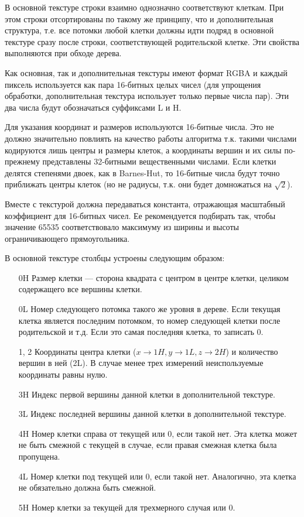 В основной текстуре строки взаимно однозначно соответствуют клеткам. При этом строки отсортированы по такому же принципу, что и дополнительная структура, т.е. все потомки любой клетки должны идти подряд в основной текстуре сразу после строки, соответствующей родительской клетке. Эти свойства выполняются при обходе дерева.

Как основная, так и дополнительная текстуры имеют формат RGBA и каждый пиксель используется как пара 16-битных целых чисел (для упрощения обработки, дополнительная текстура использует только первые числа пар). Эти два числа будут обозначаться суффиксами L и H.

Для указания координат и размеров используются 16-битные числа. Это не должно значительно повлиять на качество работы алгоритма т.к. такими числами кодируются лишь центры и размеры клеток, а координаты вершин и их силы по-прежнему представлены 32-битными вещественными числами. Если клетки делятся степенями двоек, как в Barnes-Hut, то 16-битные числа будут точно приближать центры клеток (но не радиусы, т.к. они будет домножаться на $\sqrt{2}$).

Вместе с текстурой должна передаваться константа, отражающая масштабный коэффициент для 16-битных чисел. Ее рекомендуется подбирать так, чтобы значение 65535 соответствовало максимуму из ширины и высоты ограничивающего прямоугольника.

В основной текстуре столбцы устроены следующим образом:

\begin{itemize}
\item[0H] Размер клетки --- сторона квадрата с центром в центре клетки, целиком содержащего все вершины клетки.
\item[0L] Номер следующего потомка такого же уровня в дереве. Если текущая клетка является последним потомком, то номер следующей клетки после родительской и т.д. Если это самая последняя клетка, то записать 0.
\item[1, 2] Координаты центра клетки ($x\to 1H, y\to 1L, z\to 2H$) и количество вершин в ней (2L). В случае менее трех измерений неиспользуемые координаты равны нулю.
\item[3H] Индекс первой вершины данной клетки в дополнительной текстуре.
\item[3L] Индекс последней вершины данной клетки в дополнительной текстуре.
\item[4H] Номер клетки справа от текущей или 0, если такой нет. Эта клетка может не быть смежной с текущей в случае, если правая смежная клетка была пропущена.
\item[4L] Номер клетки под текущей или 0, если такой нет. Аналогично, эта клетка не обязательно должна быть смежной.
\item[5H] Номер клетки за текущей для трехмерного случая или 0.
\end{itemize}


